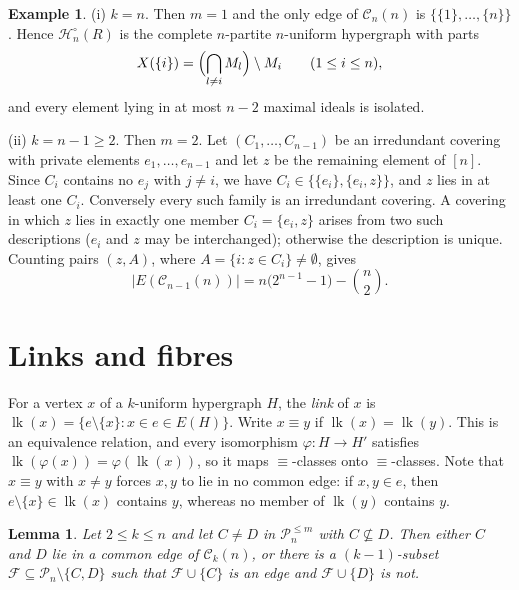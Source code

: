 \documentclass{amsart}
\newtheorem{lemma}[theorem]{Lemma}
\theoremstyle{definition}
\newtheorem{example}[theorem]{Example}
\theoremstyle{remark}
\newcommand{\lk}{\operatorname{lk}}
\newcommand{\cC}{\mathcal{C}}
\newcommand{\cF}{\mathcal{F}}
\newcommand{\cP}{\mathcal{P}}
\newcommand{\cH}{\mathcal{H}}
\newcommand{\nn}{[n]}
\begin{document}
\begin{example}\label{ex:kn}
(i) $k=n$. Then $m=1$ and the only edge of $\cC_n(n)$ is $\{\{1\},\dots,\{n\}\}$. Hence $\cH_n^{\circ}(R)$ is the complete $n$-partite $n$-uniform hypergraph with parts
\[
X(\{i\})=\Bigl(\bigcap_{l\ne i}M_l\Bigr)\setminus M_i\qquad(1\le i\le n),
\]
and every element lying in at most $n-2$ maximal ideals is isolated.

(ii) $k=n-1\ge 2$. Then $m=2$. Let $(C_1,\dots,C_{n-1})$ be an irredundant covering with private elements $e_1,\dots,e_{n-1}$ and let $z$ be the remaining element of $\nn$. Since $C_i$ contains no $e_j$ with $j\ne i$, we have $C_i\in\{\{e_i\},\{e_i,z\}\}$, and $z$ lies in at least one $C_i$. Conversely every such family is an irredundant covering. A covering in which $z$ lies in exactly one member $C_i=\{e_i,z\}$ arises from two such descriptions ($e_i$ and $z$ may be interchanged); otherwise the description is unique. Counting pairs $(z,A)$, where $A=\{i: z\in C_i\}\neq\emptyset$, gives
\[
|E(\cC_{n-1}(n))|=n\bigl(2^{n-1}-1\bigr)-\binom n2 .
\]
\end{example}

\section{Links and fibres}\label{sec:links}

For a vertex $x$ of a $k$-uniform hypergraph $H$, the \emph{link} of $x$ is $\lk(x)=\{e\setminus\{x\}: x\in e\in E(H)\}$. Write $x\equiv y$ if $\lk(x)=\lk(y)$. This is an equivalence relation, and every isomorphism $\varphi\colon H\to H'$ satisfies $\lk(\varphi(x))=\varphi(\lk(x))$, so it maps $\equiv$-classes onto $\equiv$-classes. Note that $x\equiv y$ with $x\neq y$ forces $x,y$ to lie in no common edge: if $x,y\in e$, then $e\setminus\{x\}\in\lk(x)$ contains $y$, whereas no member of $\lk(y)$ contains $y$.

\begin{lemma}\label{lem:separate}
Let $2\le k\le n$ and let $C\ne D$ in $\cP_n^{\le m}$ with $C\not\subseteq D$. Then either $C$ and $D$ lie in a common edge of $\cC_k(n)$, or there is a $(k-1)$-subset $\cF\subseteq\cP_n\setminus\{C,D\}$ such that $\cF\cup\{C\}$ is an edge and $\cF\cup\{D\}$ is not.
\end{lemma}
\end{document}
